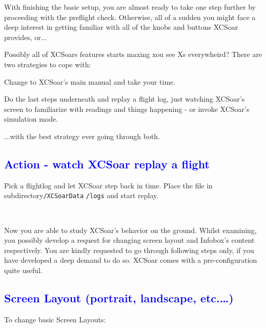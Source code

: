 With finishing the basic setup, you are almost ready to take one step further 
by proceeding with the preflight check. Otherwise, all of a sudden you might 
face a deep interest in getting familiar with all of the knobs and buttons 
XCSoar provides, or...

Possibly all of XCSoars features starts maxing xou see Xs everywheird? There 
are two strategies to cope with:

\begin{compactitem}
\item Change to XCSoar's main manual and take your time.
\item Do the last steps underneath and replay a flight log, just watching 
XCSoar's screen to familiarize with readings and things happening - or invoke 
XCSoar's simulation mode.
\end{compactitem}

...with the best strategy ever going through both.

\subsection*{\textcolor{blue}{Action - watch XCSoar replay a flight}}
Pick a flightlog and let XCSoar step back in time.  Place the file in 
subdirectory\verb+/XCSoarData+ \verb+/logs+ and start replay.

\begin{flushleft}\hspace*{1cm}\blink{}\\\end{flushleft}

Now you are able to study XCSoar's behavior on the ground. Whilst examining, 
you possibly develop a request for changing screen layout and Infobox's 
content respectively. You are kindly requested to go through following steps 
only, if you have developed a deep demand to do so.  XCSoar comes with a 
pre-configuration quite useful.

\subsection*{\textcolor{blue}{Screen Layout (portrait, landscape, etc.\dots)}} 
To change basic Screen Layouts:
\begin{flushleft}\hspace*{1cm}\sk\blink{}\blink{}\\\end{flushleft}

